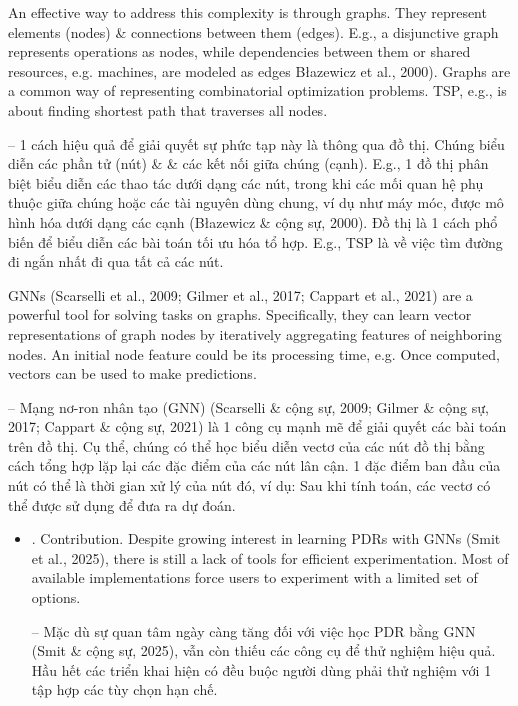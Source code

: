 \documentclass{article}
\begin{document}
\begin{itemize}
    An effective way to address this complexity is through graphs. They represent elements (nodes) \& connections between them (edges). E.g., a disjunctive graph represents operations as nodes, while dependencies between them or shared resources, e.g. machines, are modeled as edges Błazewicz et al., 2000). Graphs are a common way of representing combinatorial optimization problems. TSP, e.g., is about finding shortest path that traverses all nodes.

    -- 1 cách hiệu quả để giải quyết sự phức tạp này là thông qua đồ thị. Chúng biểu diễn các phần tử (nút) \& \& các kết nối giữa chúng (cạnh). E.g., 1 đồ thị phân biệt biểu diễn các thao tác dưới dạng các nút, trong khi các mối quan hệ phụ thuộc giữa chúng hoặc các tài nguyên dùng chung, ví dụ như máy móc, được mô hình hóa dưới dạng các cạnh (Błazewicz \& cộng sự, 2000). Đồ thị là 1 cách phổ biến để biểu diễn các bài toán tối ưu hóa tổ hợp. E.g., TSP là về việc tìm đường đi ngắn nhất đi qua tất cả các nút.

    GNNs (Scarselli et al., 2009; Gilmer et al., 2017; Cappart et al., 2021) are a powerful tool for solving tasks on graphs. Specifically, they can learn vector representations of graph nodes by iteratively aggregating features of neighboring nodes. An initial node feature could be its processing time, e.g. Once computed, vectors can be used to make predictions.

    -- Mạng nơ-ron nhân tạo (GNN) (Scarselli \& cộng sự, 2009; Gilmer \& cộng sự, 2017; Cappart \& cộng sự, 2021) là 1 công cụ mạnh mẽ để giải quyết các bài toán trên đồ thị. Cụ thể, chúng có thể học biểu diễn vectơ của các nút đồ thị bằng cách tổng hợp lặp lại các đặc điểm của các nút lân cận. 1 đặc điểm ban đầu của nút có thể là thời gian xử lý của nút đó, ví dụ: Sau khi tính toán, các vectơ có thể được sử dụng để đưa ra dự đoán.
    \begin{itemize}
        \item {. Contribution.} Despite growing interest in learning PDRs with GNNs (Smit et al., 2025), there is still a lack of tools for efficient experimentation. Most of available implementations force users to experiment with a limited set of options.

        -- Mặc dù sự quan tâm ngày càng tăng đối với việc học PDR bằng GNN (Smit \& cộng sự, 2025), vẫn còn thiếu các công cụ để thử nghiệm hiệu quả. Hầu hết các triển khai hiện có đều buộc người dùng phải thử nghiệm với 1 tập hợp các tùy chọn hạn chế.


\end{itemize}
\end{itemize}
\end{document}
